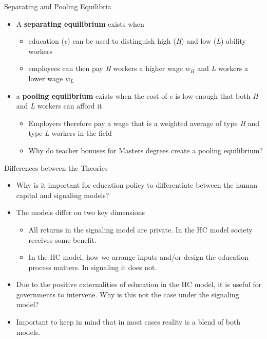 \documentclass{beamer}
\begin{document}
\begin{frame}[<+->]{Separating and Pooling Equilibria}
    \begin{itemize}
        \item A \textbf{separating equilibrium} exists when 
        \begin{itemize}
            \item education (\textit{e}) can be used to distinguish high (\textit{H}) and low (\textit{L}) ability workers
            \item employees can then pay \textit{H} workers a higher wage $w_H$ and \textit{L} workers a lower wage $w_L$
        \end{itemize}
        \item a \textbf{pooling equilibrium} exists when the cost of \textit{e} is low enough that both \textit{H} and \textit{L} workers can afford it
        \begin{itemize}
            \item Employers therefore pay a wage that is a weighted average of type \textit{H} and type \textit{L} workers in the field
            \item Why do teacher  bonuses for Masters degrees create a pooling equilibrium?
        \end{itemize}
    
    \end{itemize}
\end{frame}


\begin{frame}[<+->]{Differences between the Theories}
	\begin{itemize}
		\item Why is it important for education policy to differentiate between the human capital and signaling models? 
		\item The models differ on two key dimensions
		\begin{itemize}
		        \item All returns in the signaling model are private. In the HC model society receives some benefit.
      			  \item In the HC model, how we arrange inputs and/or design the education process matters. In signaling it does not.
		\end{itemize}
		\item   Due to the positive externalities of education in the HC model, it is useful for governments to intervene. Why is this not the case under the signaling model? 
		\item   Important to keep in mind that in most cases reality is a blend of both models.
	\end{itemize}
    
\end{frame}
\end{document}
